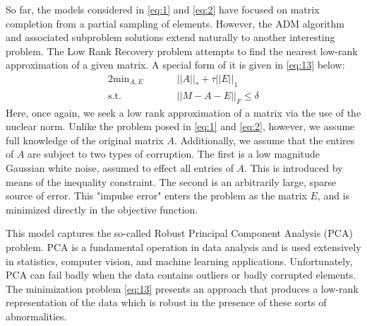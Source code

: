 \documentclass{article}
\begin{document}
So far, the models considered in \ref{eq:1} and \ref{eq:2} have focused on matrix completion from a partial sampling of elements.  However, the ADM algorithm and associated subproblem solutions extend naturally to another interesting problem.  The Low Rank Recovery problem attempts to find the nearest low-rank approximation of a given matrix.  A special form of it is given in \ref{eq:13} below:
\begin{alignat}{2} \label{eq:13}
\textrm{min}_{A,E}& \quad &&||A||_* + \tau ||E||_1\\
\textrm{s.t.}& &&||M - A - E||_F \le \delta \nonumber
\end{alignat}
Here, once again, we seek a low rank approximation of a matrix via the use of the nuclear norm.  Unlike the problem posed in \ref{eq:1} and \ref{eq:2}, however, we assume full knowledge of the original matrix $A$.  Additionally, we assume that the entires of $A$ are subject to two types of corruption.  The first is a low magnitude Gaussian white noise, assumed to effect all entries of $A$.  This is introduced by means of the inequality constraint.  The second is an arbitrarily large, sparse source of error.  This "impulse error" enters the problem as the matrix $E$, and is minimized directly in the objective function. 

This model captures the so-called Robust Principal Component Analysis (PCA) problem.  PCA is a fundamental operation in data analysis and is used extensively in statistics, computer vision, and machine learning applications.  Unfortunately, PCA can fail badly when the data contains outliers or badly corrupted elements.  The minimization problem \ref{eq:13} presents an approach that produces a low-rank representation of the data which is robust in the presence of these sorts of abnormalities.
\end{document}
